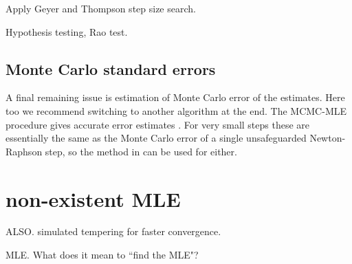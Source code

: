 Apply Geyer and Thompson step size search.

Hypothesis testing, Rao test.

\subsection{Monte Carlo standard errors}
 A final remaining issue is estimation of Monte Carlo error of the estimates.  Here 
too we recommend switching to another
algorithm at the end.  The MCMC-MLE procedure gives accurate error estimates 
\citep{Geyer:1994}.
For very small steps these are essentially the same as the Monte Carlo error of a 
single unsafeguarded Newton-Raphson step,
so the method in \citep{Geyer:1994} can be used for either.

\section{non-existent MLE}
ALSO.  simulated tempering for faster convergence.

MLE.  What does it mean to ``find the MLE"?
